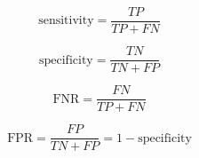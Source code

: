 \begin{equation} \label{eq:sensitivity}
\text{sensitivity} = \frac{TP}{TP + FN}
\end{equation}

\begin{equation} \label{eq:specificity}
\text{specificity} = \frac{TN}{TN + FP}
\end{equation}

\begin{equation} \label{eq:FNR}
\text{FNR} = \frac{FN}{TP + FN}
\end{equation}

\begin{equation} \label{eq:FPR}
\text{FPR} = \frac{FP}{TN + FP} = 1 - \text{specificity}
\end{equation}
\\



